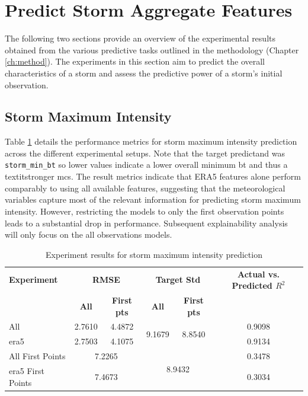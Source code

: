 \section{Predict Storm Aggregate Features}

The following two sections provide an overview of the experimental results obtained from the various predictive tasks outlined in the methodology (Chapter \ref{ch:method}). The experiments in this section aim to predict the overall characteristics of a storm and assess the predictive power of a storm's initial observation.

\subsection{Storm Maximum Intensity}

Table \ref{tab:storm_max_intensity_results} details the performance metrics for storm maximum intensity prediction across the different experimental setups. Note that the target predictand was \texttt{storm\_min\_bt} so lower values indicate a lower overall minimum \acrshort{bt} and thus a textit{stronger} \acrshort{mcs}. The result metrics indicate that ERA5 features alone perform comparably to using all available features, suggesting that the meteorological variables capture most of the relevant information for predicting storm maximum intensity. However, restricting the models to only the first observation points leads to a substantial drop in performance. Subsequent explainability analysis will only focus on the all observations models.

\begin{table}[ht]
\centering
\caption{Experiment results for storm maximum intensity prediction}
\label{tab:storm_max_intensity_results}
\begin{tabular}{lccccc}
\hline
\textbf{Experiment} & \multicolumn{2}{c}{\textbf{RMSE}} & \multicolumn{2}{c}{\textbf{Target Std}} & \textbf{Actual vs. Predicted $R^2$} \\
\cline{2-5}
 & \textbf{All} & \textbf{First pts} & \textbf{All} & \textbf{First pts} &  \\
\hline
All              & 2.7610 & 4.4872 & \multirow{2}{*}{9.1679} & \multirow{2}{*}{8.8540} & 0.9098 \\
\acrshort{era5}  & 2.7503 & 4.1075 & & & 0.9134 \\
All First Points & \multicolumn{2}{c}{7.2265} & \multicolumn{2}{c}{\multirow{2}{*}{8.9432}} & 0.3478 \\
\acrshort{era5} First Points & \multicolumn{2}{c}{7.4673} & & & 0.3034 \\
\hline
\end{tabular}
\end{table}

